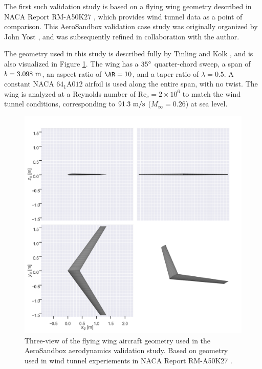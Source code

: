 The first such validation study is based on a flying wing geometry described in NACA Report RM-A50K27 \cite{tinling_effects_1951}, which provides wind tunnel data as a point of comparison. This AeroSandbox validation case study was originally organized by John Yost \cite{yost2022}, and was subsequently refined in collaboration with the author.

The geometry used in this study is described fully by Tinling and Kolk \cite{tinling_effects_1951}, and is also visualized in Figure \ref{fig:fw_geometry}. The wing has a $35\degree$ quarter-chord sweep, a span of $b=3.098\ \rm m$, an aspect ratio of $\AR = 10$, and a taper ratio of $\lambda=0.5$. A constant NACA $\mathrm{64_{1}A012}$ airfoil is used along the entire span, with no twist. The wing is analyzed at a Reynolds number of $\text{Re}_c=2 \times 10^6$ to match the wind tunnel conditions, corresponding to $91.3\ \rm m/s$ ($M_\infty=0.26$) at sea level.

\begin{figure}[!htb]
    \centering
    \includegraphics[width=5in]{../figures/aero_validation/flying_wing_geometry.png}
    \caption{Three-view of the flying wing aircraft geometry used in the AeroSandbox aerodynamics validation study. Based on geometry used in wind tunnel experiements in NACA Report RM-A50K27 \cite{tinling_effects_1951}.}
    \label{fig:fw_geometry}
\end{figure}

